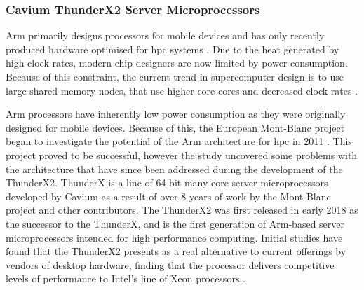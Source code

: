 \documentclass[a4paper,11pt]{report}
\begin{document}


\subsubsection{Cavium ThunderX2 Server Microprocessors}
Arm primarily designs processors for mobile devices and has only recently produced hardware optimised for \gls{hpc} systems \cite{mcintosh2018performance}. Due to the heat generated by high clock rates, modern chip designers are now limited by power consumption. Because of this constraint, the current trend in supercomputer design is to use large shared-memory nodes, that use higher core cores and decreased clock rates \cite{kindratenko2011trends}. 
\par
Arm processors have inherently low power consumption as they were originally designed for mobile devices. Because of this, the European Mont-Blanc project began to investigate the potential of the Arm architecture for \gls{hpc} in 2011 \cite{Rajovic:2016:MPA:3014904.3014955}. This project proved to be successful, however the study uncovered some problems with the architecture that have since been addressed during the development of the ThunderX2. ThunderX is a line of 64-bit many-core server microprocessors developed by Cavium as a result of over 8 years of work by the Mont-Blanc project and other contributors. The ThunderX2 was first released in early 2018 as the successor to the ThunderX, and is the first generation of Arm-based server microprocessors intended for high performance computing. Initial studies have found that the ThunderX2 presents as a real alternative to current offerings by vendors of desktop hardware, finding that the processor delivers competitive levels of performance to Intel's line of Xeon processors \cite{calore2018advanced, mcintosh2018performance}. 
\par
\end{document}
